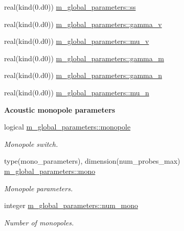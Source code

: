 \begin{Indent}
\begin{DoxyCompactItemize}
real(kind(0.d0)) \hyperlink{namespacem__global__parameters_ab2260b0199f0043981fba75890dbff3d}{m\+\_\+global\+\_\+parameters\+::ss}
\item 
real(kind(0.d0)) \hyperlink{namespacem__global__parameters_a9a7da412ab2c84481f1c2bb636e83e10}{m\+\_\+global\+\_\+parameters\+::gamma\+\_\+v}
\item 
real(kind(0.d0)) \hyperlink{namespacem__global__parameters_a2224d20370b84925128e1b1bbae8e8df}{m\+\_\+global\+\_\+parameters\+::mu\+\_\+v}
\item 
real(kind(0.d0)) \hyperlink{namespacem__global__parameters_adfa6a4a17c338d84a6d6ad5a0b9412de}{m\+\_\+global\+\_\+parameters\+::gamma\+\_\+m}
\item 
real(kind(0.d0)) \hyperlink{namespacem__global__parameters_ad507a6f681cefe17e49f283d47a7c0ad}{m\+\_\+global\+\_\+parameters\+::gamma\+\_\+n}
\item 
real(kind(0.d0)) \hyperlink{namespacem__global__parameters_a7829126e47034f2e39153efa144bc17b}{m\+\_\+global\+\_\+parameters\+::mu\+\_\+n}
\end{DoxyCompactItemize}
\end{Indent}
\begin{Indent}\textbf{ Acoustic monopole parameters}\par
\begin{DoxyCompactItemize}
\item 
logical \hyperlink{namespacem__global__parameters_a459b1e7574742f115d5562325c575428}{m\+\_\+global\+\_\+parameters\+::monopole}
\begin{DoxyCompactList}\small\item\em Monopole switch. \end{DoxyCompactList}\item 
type(mono\+\_\+parameters), dimension(num\+\_\+probes\+\_\+max) \hyperlink{namespacem__global__parameters_ac91cb1bc506e2e71e46001986a7232b4}{m\+\_\+global\+\_\+parameters\+::mono}
\begin{DoxyCompactList}\small\item\em Monopole parameters. \end{DoxyCompactList}\item 
integer \hyperlink{namespacem__global__parameters_a987e51cca357206f1e35d38a1cb7e5e6}{m\+\_\+global\+\_\+parameters\+::num\+\_\+mono}
\begin{DoxyCompactList}\small\item\em Number of monopoles. \end{DoxyCompactList}\end{DoxyCompactItemize}
\end{Indent}


